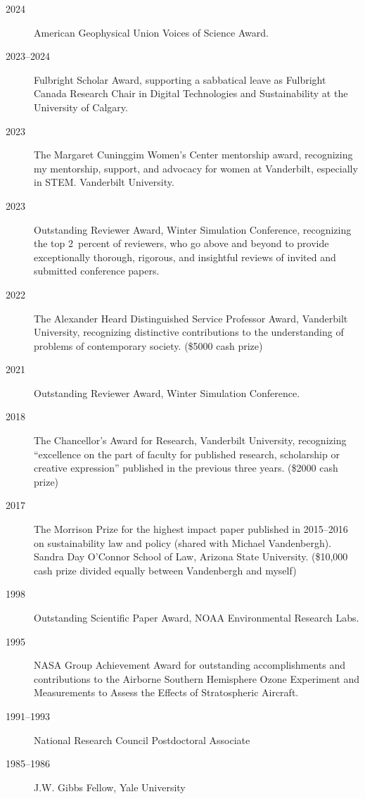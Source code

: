 \begin{description}
\item[2024] American Geophysical Union Voices of Science Award.
\item[2023--2024] Fulbright Scholar Award, supporting a sabbatical leave as
  Fulbright Canada Research Chair in Digital Technologies and Sustainability
  at the University of Calgary.
\item[2023] The Margaret Cuninggim Women's Center mentorship award, recognizing
  my mentorship, support, and advocacy for women at Vanderbilt, especially in
  STEM. Vanderbilt University.
\item[2023] Outstanding Reviewer Award, Winter Simulation Conference,
  recognizing the top 2~percent of reviewers, who go above and beyond to provide
  exceptionally thorough, rigorous, and insightful reviews of invited and
  submitted conference papers.
\item[2022] The Alexander Heard Distinguished Service Professor Award,
  Vanderbilt University, recognizing distinctive contributions to the
  understanding of problems of contemporary society.
  (\$5000 cash prize)
\item[2021] Outstanding Reviewer Award, Winter Simulation Conference.
\item[2018] The Chancellor's Award for Research, Vanderbilt University,
  recognizing ``excellence on the part of faculty for
  published research, scholarship or creative expression'' published in the
  previous three years.
  (\$2000 cash prize)
\item[2017] The Morrison Prize for the highest impact paper published in
  2015--2016 on sustainability law and policy (shared with Michael Vandenbergh).
  Sandra Day O'Connor School of Law, Arizona State University.
  (\$10,000 cash prize divided equally between Vandenbergh and myself)
\item[1998] Outstanding Scientific Paper Award, NOAA Environmental Research
  Labs.
\item[1995] NASA Group Achievement Award for outstanding accomplishments and
  contributions to the Airborne Southern Hemisphere Ozone Experiment and
  Measurements to Assess the Effects of Stratospheric Aircraft.
\item[1991--1993] National Research Council Postdoctoral Associate
\item[1985--1986] J.W. Gibbs Fellow, Yale University
\end{description}
